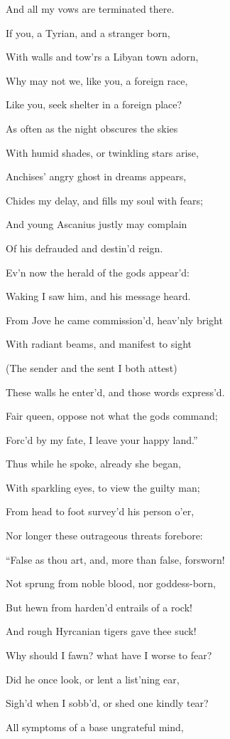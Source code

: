 And all my vows are terminated there.

If you, a Tyrian, and a stranger born,

With walls and tow’rs a Libyan town adorn,

Why may not we, like you, a foreign race,

Like you, seek shelter in a foreign place?

As often as the night obscures the skies

With humid shades, or twinkling stars arise,

Anchises’ angry ghost in dreams appears,

Chides my delay, and fills my soul with fears;

And young Ascanius justly may complain

Of his defrauded and destin’d reign.

Ev’n now the herald of the gods appear’d:

Waking I saw him, and his message heard.

From Jove he came commission’d, heav’nly bright

With radiant beams, and manifest to sight

(The sender and the sent I both attest)

These walls he enter’d, and those words express’d.

Fair queen, oppose not what the gods command;

Forc’d by my fate, I leave your happy land.”

Thus while he spoke, already she began,

With sparkling eyes, to view the guilty man;

From head to foot survey’d his person o’er,

Nor longer these outrageous threats forebore:

“False as thou art, and, more than false, forsworn!

Not sprung from noble blood, nor goddess-born,

But hewn from harden’d entrails of a rock!

And rough Hyrcanian tigers gave thee suck!

Why should I fawn? what have I worse to fear?

Did he once look, or lent a list’ning ear,

Sigh’d when I sobb’d, or shed one kindly tear?

All symptoms of a base ungrateful mind,

